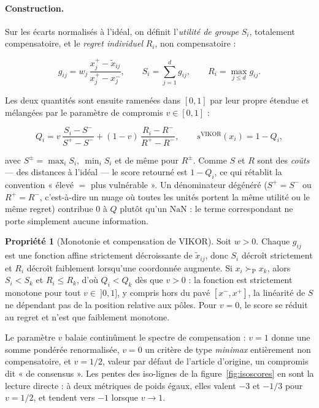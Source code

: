 \documentclass[11pt,a4paper]{article}
\theoremstyle{definition}
\newtheorem{propriete}{Propriété}[section]
\theoremstyle{remark}
\newcommand{\pareto}{\succ_{\mathrm{P}}}
\begin{document}
\medskip

\paragraph{Construction.} Sur les écarts normalisés à l'idéal, on définit l'\emph{utilité
de groupe} $S_i$, totalement compensatoire, et le \emph{regret individuel} $R_i$,
non compensatoire :

\medskip

\[
  g_{ij} = w_j\,\frac{x^{+}_j - \tilde{x}_{ij}}{x^{+}_j - x^{-}_j},
  \qquad
  S_i = \sum_{j=1}^{d} g_{ij},
  \qquad
  R_i = \max_{j \le d} g_{ij} .
\]

\bigskip

Les deux quantités sont ensuite ramenées dans $[0,1]$ par leur propre étendue et mélangées
par le paramètre de compromis $v \in [0,1]$ :

\medskip

\[
  Q_i = v\,\frac{S_i - S^{-}}{S^{+} - S^{-}}
      + (1 - v)\,\frac{R_i - R^{-}}{R^{+} - R^{-}},
  \qquad
  s^{\mathrm{VIKOR}}(x_i) = 1 - Q_i ,
\]

\bigskip

avec $S^{\pm} = \max_i S_i,\ \min_i S_i$ et de même pour $R^{\pm}$. Comme $S$ et $R$ sont
des \emph{coûts} --- des distances à l'idéal --- le score retourné est $1 - Q_i$, ce qui
rétablit la convention « élevé $=$ plus vulnérable ». Un dénominateur dégénéré
($S^{+} = S^{-}$ ou $R^{+} = R^{-}$, c'est-à-dire un nuage où toutes les unités portent la
même utilité ou le même regret) contribue $0$ à $Q$ plutôt qu'un $\mathrm{NaN}$ : le terme
correspondant ne porte simplement aucune information.

\medskip

\begin{propriete}[Monotonie et compensation de VIKOR]
  \label{prop:vikor}
  Soit $w > 0$. Chaque $g_{ij}$ est une fonction affine strictement décroissante de
  $\tilde{x}_{ij}$, donc $S_i$ décroît strictement et $R_i$ décroît faiblement lorsqu'une
  coordonnée augmente. Si $x_i \pareto x_k$, alors $S_i < S_k$ et $R_i \le R_k$, d'où
  $Q_i < Q_k$ dès que $v > 0$ : la fonction est strictement monotone pour tout
  $v \in\ ]0,1]$, y compris hors du pavé $[x^{-}, x^{+}]$, la linéarité de $S$ ne
  dépendant pas de la position relative aux pôles. Pour $v = 0$, le score se réduit au
  regret et n'est que faiblement monotone.

  \medskip

  Le paramètre $v$ balaie continûment le spectre de compensation : $v = 1$ donne une somme
  pondérée renormalisée, $v = 0$ un critère de type \emph{minimax} entièrement
  non compensatoire, et $v = 1/2$, valeur par défaut de l'article d'origine, un compromis
  dit « de consensus ». Les pentes des iso-lignes de la figure~\ref{fig:isoscores} en sont
  la lecture directe : à deux métriques de poids égaux, elles valent $-3$ et $-1/3$ pour
  $v = 1/2$, et tendent vers $-1$ lorsque $v \to 1$.
\end{propriete}
\end{document}
